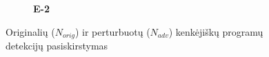 \begin{figure}[h]
\begin{small}
\begin{center}
\begin{subfigure}[t]{0.48\textwidth}
                \caption{\textbf{E-2}}
            \end{subfigure}
        \end{center}
        \caption{Originalių ($N_{orig}$) ir perturbuotų ($N_{adv}$) kenkėjiškų programų detekcijų pasiskirstymas}\label{fig:experiment:det_dist}
    \end{small}
\end{figure}